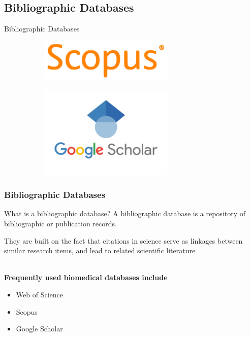 \documentclass{beamer}
\begin{document}
\subsection{Bibliographic Databases}
\begin{frame}
    \begin{center}
        {\huge Bibliographic Databases}
    \end{center}
    \begin{figure}[h]
        \begin{subfigure}{0.49\textwidth}
            \centering
            \includegraphics[width=0.7\textwidth]{s.png}
        \end{subfigure}
        \begin{subfigure}{0.49\textwidth}
            \centering
            \includegraphics[width=0.7\textwidth]{gs.png}
        \end{subfigure}
    \end{figure}
\end{frame}
\begin{frame}

    \frametitle{Bibliographic Databases}

    \begin{block}{What is a bibliographic database?}
       A bibliographic database is a repository of bibliographic or publication records.
    \end{block}

    They are built on the fact that citations in science serve as linkages between similar research items, and lead to related scientific literature\\~\

    \textbf{Frequently used biomedical databases include}
    \begin{itemize}
        \item Web of Science
        \item Scopus
        \item  Google Scholar
    \end{itemize}
\end{frame}
\end{document}
